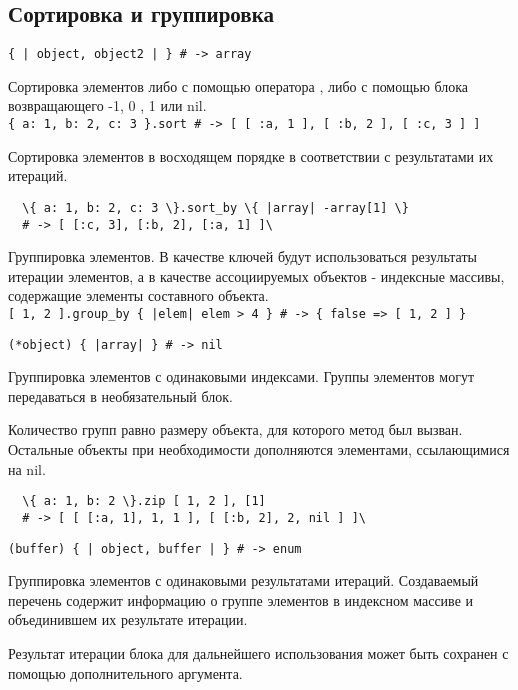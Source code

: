 \subsection*{Сортировка и группировка}

\begin{methodlist}
  \verb!{ | object, object2 | } # -> array!

  Сортировка элементов либо с помощью оператора \method{<=>}, либо с помощью блока возвращающего -1, 0 , 1 или nil. 
  \\\verb!{ a: 1, b: 2, c: 3 }.sort # -> [ [ :a, 1 ], [ :b, 2 ], [ :c, 3 ] ]!
 
  Сортировка элементов в восходящем порядке в соответствии с результатами их итераций.
  \begin{verbatim}
  \{ a: 1, b: 2, c: 3 \}.sort_by \{ |array| -array[1] \}
  # -> [ [:c, 3], [:b, 2], [:a, 1] ]\
  \end{verbatim}  
 
  Группировка элементов. В качестве ключей будут использоваться результаты итерации элементов, а в качестве ассоциируемых объектов - индексные массивы, содержащие элементы составного объекта. 
  \\\verb![ 1, 2 ].group_by { |elem| elem > 4 } # -> { false => [ 1, 2 ] }!

  \verb!(*object) { |array| } # -> nil!

  Группировка элементов с одинаковыми индексами. Группы элементов могут передаваться в необязательный блок. 

  Количество групп равно размеру объекта, для которого метод был вызван. Остальные объекты при необходимости дополняются элементами, ссылающимися на nil.
  \begin{verbatim}
  \{ a: 1, b: 2 \}.zip [ 1, 2 ], [1]  
  # -> [ [ [:a, 1], 1, 1 ], [ [:b, 2], 2, nil ] ]\
  \end{verbatim}

  \verb!(buffer) { | object, buffer | } # -> enum!

  Группировка элементов с одинаковыми результатами итераций. Создаваемый перечень содержит информацию о группе элементов в индексном массиве и объединившем их результате итерации. 

  Результат итерации блока для дальнейшего использования может быть сохранен с помощью дополнительного аргумента. 


\end{methodlist}
